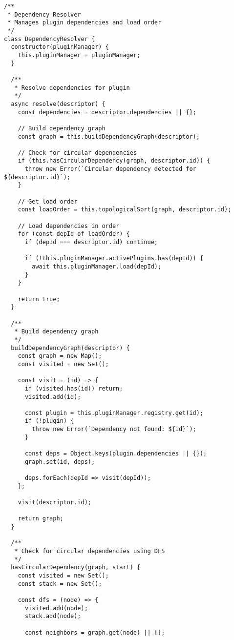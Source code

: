 \documentclass[11pt]{article}
\begin{document}
\begin{verbatim}
/**
 * Dependency Resolver
 * Manages plugin dependencies and load order
 */
class DependencyResolver {
  constructor(pluginManager) {
    this.pluginManager = pluginManager;
  }
  
  /**
   * Resolve dependencies for plugin
   */
  async resolve(descriptor) {
    const dependencies = descriptor.dependencies || {};
    
    // Build dependency graph
    const graph = this.buildDependencyGraph(descriptor);
    
    // Check for circular dependencies
    if (this.hasCircularDependency(graph, descriptor.id)) {
      throw new Error(`Circular dependency detected for ${descriptor.id}`);
    }
    
    // Get load order
    const loadOrder = this.topologicalSort(graph, descriptor.id);
    
    // Load dependencies in order
    for (const depId of loadOrder) {
      if (depId === descriptor.id) continue;
      
      if (!this.pluginManager.activePlugins.has(depId)) {
        await this.pluginManager.load(depId);
      }
    }
    
    return true;
  }
  
  /**
   * Build dependency graph
   */
  buildDependencyGraph(descriptor) {
    const graph = new Map();
    const visited = new Set();
    
    const visit = (id) => {
      if (visited.has(id)) return;
      visited.add(id);
      
      const plugin = this.pluginManager.registry.get(id);
      if (!plugin) {
        throw new Error(`Dependency not found: ${id}`);
      }
      
      const deps = Object.keys(plugin.dependencies || {});
      graph.set(id, deps);
      
      deps.forEach(depId => visit(depId));
    };
    
    visit(descriptor.id);
    
    return graph;
  }
  
  /**
   * Check for circular dependencies using DFS
   */
  hasCircularDependency(graph, start) {
    const visited = new Set();
    const stack = new Set();
    
    const dfs = (node) => {
      visited.add(node);
      stack.add(node);
      
      const neighbors = graph.get(node) || [];
      

\end{verbatim}
\end{document}
